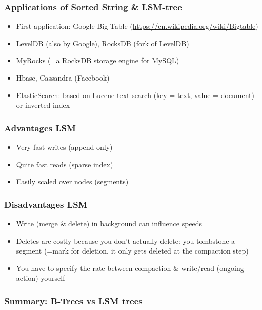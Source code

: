 \documentclass{article}
\begin{document}
\subsubsection{Applications of Sorted String \& LSM-tree}

\begin{itemize}
    \item First application: Google Big Table (\url{https://en.wikipedia.org/wiki/Bigtable})
    \item LevelDB (also by Google), RocksDB (fork of LevelDB)
    \item MyRocks (=a RocksDB storage engine for MySQL)
    \item Hbase, Cassandra (Facebook)
    \item ElasticSearch: based on Lucene text search (key = text, value = document) or inverted index
\end{itemize}

\subsubsection{Advantages LSM}

\begin{itemize}
    \item Very fast writes (append-only)
    \item Quite fast reads (sparse index)
    \item Easily scaled over nodes (segments)
\end{itemize}

\subsubsection{Disadvantages LSM}

\begin{itemize}
    \item Write (merge \& delete) in background can influence speeds
    \item Deletes are costly because you don't actually delete: you tombstone a segment (=mark for deletion, it only gets deleted at the compaction step)
    \item You have to specify the rate between compaction \& write/read (ongoing action) yourself
\end{itemize}

\subsubsection{Summary: B-Trees vs LSM trees}
\end{document}
